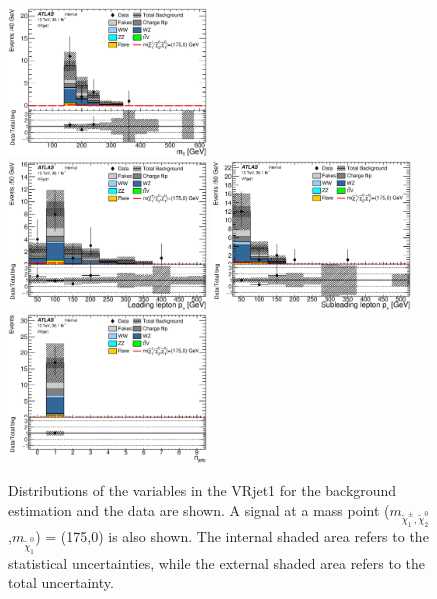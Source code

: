\begin{figure}[htbp]
\includegraphics[width=0.47\textwidth]{data/plot/VR/all_Mt_VRjet1.eps} \\
\includegraphics[width=0.47\textwidth]{data/plot/VR/all_PtLep_VRjet1.eps}
\includegraphics[width=0.47\textwidth]{data/plot/VR/all_PtSublep_VRjet1.eps} \\
\includegraphics[width=0.47\textwidth]{data/plot/VR/all_Njets_VRjet1.eps}
\caption{Distributions of the variables in the VRjet1 for the background estimation and the data are shown. A signal at a mass point ($m_{\tilde{\chi}_1^\pm , \tilde{\chi}_2^0}$,$m_{\tilde{\chi}_1^0}$) = (175,0) is also shown. The internal shaded area refers to the statistical uncertainties, while the external shaded area refers to the total uncertainty.}
\label{fig:VRjet1_plot}
\end{figure}

